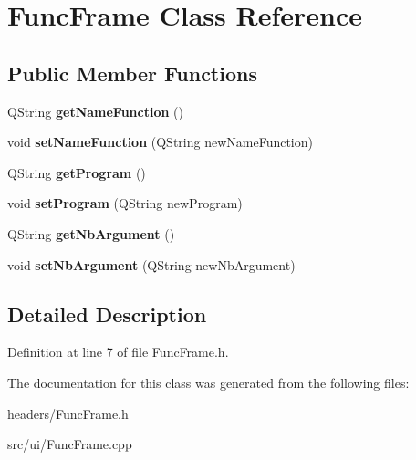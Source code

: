 \hypertarget{classFuncFrame}{\section{Func\+Frame Class Reference}
\label{classFuncFrame}
}
\subsection*{Public Member Functions}
\begin{DoxyCompactItemize}
\item 
\hypertarget{classFuncFrame_a916578977ef70ff3c7ee122b6f6db66e}{Q\+String {\bfseries get\+Name\+Function} ()}\label{classFuncFrame_a916578977ef70ff3c7ee122b6f6db66e}

\item 
\hypertarget{classFuncFrame_a5f4f491f860fc85ae9a869dcd38903e9}{void {\bfseries set\+Name\+Function} (Q\+String new\+Name\+Function)}\label{classFuncFrame_a5f4f491f860fc85ae9a869dcd38903e9}

\item 
\hypertarget{classFuncFrame_a88602664b8f523253fd2101e69b37eee}{Q\+String {\bfseries get\+Program} ()}\label{classFuncFrame_a88602664b8f523253fd2101e69b37eee}

\item 
\hypertarget{classFuncFrame_a97f31b356169a11a0d59a7ffae691fc7}{void {\bfseries set\+Program} (Q\+String new\+Program)}\label{classFuncFrame_a97f31b356169a11a0d59a7ffae691fc7}

\item 
\hypertarget{classFuncFrame_a68840fd54f2898a079480b5b2944b01f}{Q\+String {\bfseries get\+Nb\+Argument} ()}\label{classFuncFrame_a68840fd54f2898a079480b5b2944b01f}

\item 
\hypertarget{classFuncFrame_a328e3c73c5a974dc1f6f2e63a89a640a}{void {\bfseries set\+Nb\+Argument} (Q\+String new\+Nb\+Argument)}\label{classFuncFrame_a328e3c73c5a974dc1f6f2e63a89a640a}

\end{DoxyCompactItemize}


\subsection{Detailed Description}


Definition at line 7 of file Func\+Frame.\+h.



The documentation for this class was generated from the following files\+:\begin{DoxyCompactItemize}
\item 
headers/Func\+Frame.\+h\item 
src/ui/Func\+Frame.\+cpp\end{DoxyCompactItemize}
